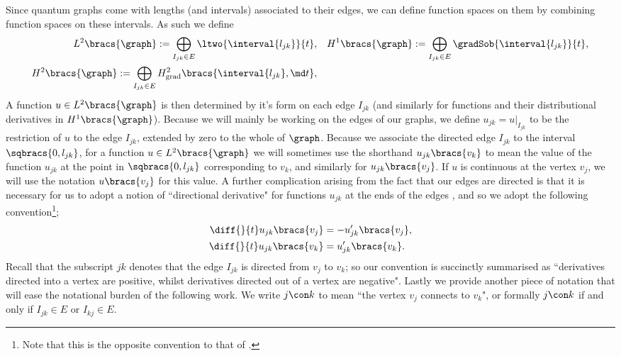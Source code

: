 Since quantum graphs come with lengths (and intervals) associated to their edges, we can define function spaces on them by combining function spaces on these intervals.
As such we define
\begin{subequations} \label{eq:GraphFuncSpaces}
	\begin{align}
		L^2\bracs{\graph} := \bigoplus_{I_{jk}\in E} \ltwo{\interval{l_{jk}}}{t},
		&\quad H^1\bracs{\graph} := \bigoplus_{I_{jk}\in E} \gradSob{\interval{l_{jk}}}{t}, \\
		H^2\bracs{\graph} := \bigoplus_{I_{jk}\in E} H^2_\mathrm{grad}\bracs{\interval{l_{jk}}, \md t}, &
	\end{align}
\end{subequations}
A function $u\in L^2\bracs{\graph}$ is then determined by it's form on each edge $I_{jk}$ (and similarly for functions and their distributional derivatives in $H^1\bracs{\graph}$).
Because we will mainly be working on the edges of our graphs, we define $u_{jk} = u\vert_{I_{jk}}$ to be the restriction of $u$ to the edge $I_{jk}$, extended by zero to the whole of $\graph$.
Because we associate the directed edge $I_{jk}$ to the interval $\sqbracs{0,l_{jk}}$, for a function $u\in L^2\bracs{\graph}$ we will sometimes use the shorthand $u_{jk}\bracs{v_k}$ to mean the value of the function $u_{jk}$ at the point in $\sqbracs{0,l_{jk}}$ corresponding to $v_k$, and similarly for $u_{jk}\bracs{v_j}$.
If $u$ is continuous at the vertex $v_j$, we will use the notation $u\bracs{v_j}$ for this value.
A further complication arising from the fact that our edges are directed is that it is necessary for us to adopt a notion of ``directional derivative" for functions $u_{jk}$ at the ends of the edges \cite{ershova2014isospectrality}, and so we adopt the following convention\footnote{Note that this is the opposite convention to that of \cite{ershova2014isospectrality}.};
\begin{align*}
	\diff{}{t}u_{jk}\bracs{v_j} &= -u'_{jk}\bracs{v_j}, \\
	\diff{}{t}u_{jk}\bracs{v_k} &= u'_{jk}\bracs{v_k}.
\end{align*}
Recall that the subscript $jk$ denotes that the edge $I_{jk}$ is directed from $v_j$ to $v_k$; so our convention is succinctly summarised as ``derivatives directed into a vertex are positive, whilst derivatives directed out of a vertex are negative". 
Lastly we provide another piece of notation that will ease the notational burden of the following work.
We write $j\con k$ to mean ``the vertex $v_j$ connects to $v_k$", or formally $j\con k$ if and only if $I_{jk}\in E$ or $I_{kj}\in E$.
